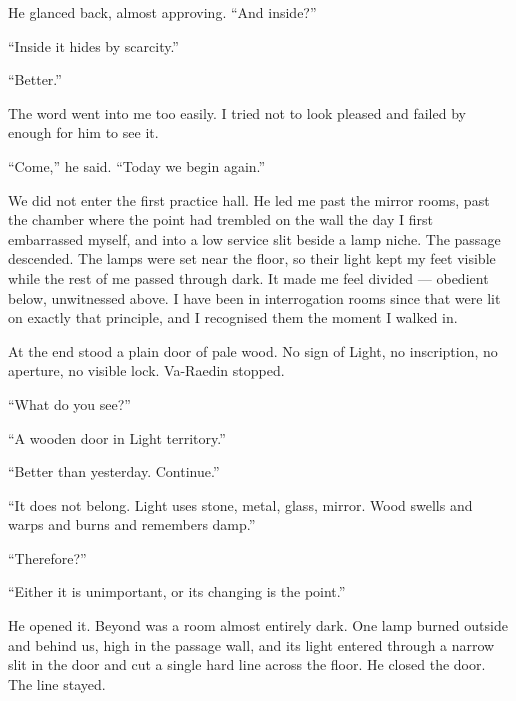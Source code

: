 He glanced back, almost approving. ``And inside?''\par

``Inside it hides by scarcity.''\par

``Better.''\par

The word went into me too easily. I tried not to look pleased and failed by enough for him to see it.\par

``Come,'' he said. ``Today we begin again.''\par

We did not enter the first practice hall. He led me past the mirror rooms, past the chamber where the point had trembled on the wall the day I first embarrassed myself, and into a low service slit beside a lamp niche. The passage descended. The lamps were set near the floor, so their light kept my feet visible while the rest of me passed through dark. It made me feel divided --- obedient below, unwitnessed above. I have been in interrogation rooms since that were lit on exactly that principle, and I recognised them the moment I walked in.\par

At the end stood a plain door of pale wood. No sign of Light, no inscription, no aperture, no visible lock. Va-Raedin stopped.\par

``What do you see?''\par

``A wooden door in Light territory.''\par

``Better than yesterday. Continue.''\par

``It does not belong. Light uses stone, metal, glass, mirror. Wood swells and warps and burns and remembers damp.''\par

``Therefore?''\par

``Either it is unimportant, or its changing is the point.''\par

He opened it. Beyond was a room almost entirely dark. One lamp burned outside and behind us, high in the passage wall, and its light entered through a narrow slit in the door and cut a single hard line across the floor. He closed the door. The line stayed.\par

